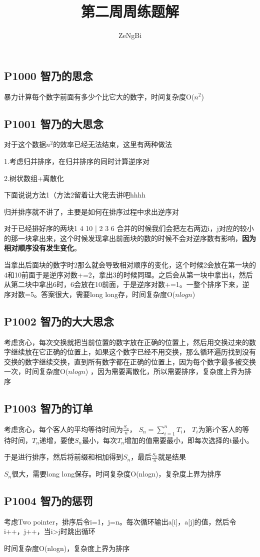 \documentclass[UTF8]{ctexart}
\title{第二周周练题解}
\author{ZeNgBi}
\date{}
\begin{document}
	\maketitle
	\subsection*{P1000 智乃的思念}
	暴力计算每个数字前面有多少个比它大的数字，时间复杂度O($n^2$)
	\subsection*{P1001 智乃的大思念}
	对于这个数据$n^2$的效率已经无法结束，这里有两种做法
	
	1.考虑归并排序，在归并排序的同时计算逆序对
	
	2.树状数组+离散化
	
	下面说说方法1（方法2留着让大佬去讲吧hhhh
	
	归并排序就不讲了，主要是如何在排序过程中求出逆序对
	
	对于已经排好序的两块1 4 10 | 2 3 6 合并的时候我们会把左右两边i，j对应的较小的那一块拿出来，这个时候发现拿出前面块的数的时候不会对逆序数有影响，\textbf{因为相对顺序没有发生变化}。
	
	
	当拿出后面块的数字时2那么就会导致相对顺序的变化，这个时候2会放在第一块的4和10前面于是逆序对数+=2，拿出3的时候同理。之后会从第一块中拿出4，然后从第二块中拿出6时，6会放在10前面，于是逆序对数+=1。一整个排序下来，逆序对数=5。答案很大，需要long long存，时间复杂度O($nlogn$)
	
	\subsection*{P1002 智乃的大大思念}
	考虑贪心，每次交换就把当前位置的数字放在正确的位置上，然后用交换过来的数字继续放在它正确的位置上，如果这个数字已经不用交换，那么循环遍历找到没有交换的数字继续交换，直到所有数字都在正确的位置上，因为每个数字最多被交换一次，时间复杂度O($nlogn$) ，因为需要离散化，所以需要排序，复杂度上界为排序
	
	\subsection*{P1003 智乃的订单}
	考虑贪心，每个客人的平均等待时间为$\frac{S_n}{n}$， $S_n=\sum_{i=1}^{n} T_i$， $T_i$为第i个客人的等待时间，$T_n$递增，要使$S_n$最小，每次$T_n$增加的值需要最小，即每次选择的t最小。
	
	于是进行排序，然后将前缀和相加得到$S_n$，最后$\frac{S_n}{n}$就是结果
	
	$S_n$很大，需要long long保存。时间复杂度O(nlogn)，复杂度上界为排序
	
	\subsection*{P1004 智乃的惩罚}
	考虑Two pointer，排序后令i=1，j=n。每次循环输出a[i]，a[j]的值，然后令i++，j++，当i>j时跳出循环
	
	时间复杂度O(nlogn)，复杂度上界为排序
	
	
\end{document}
